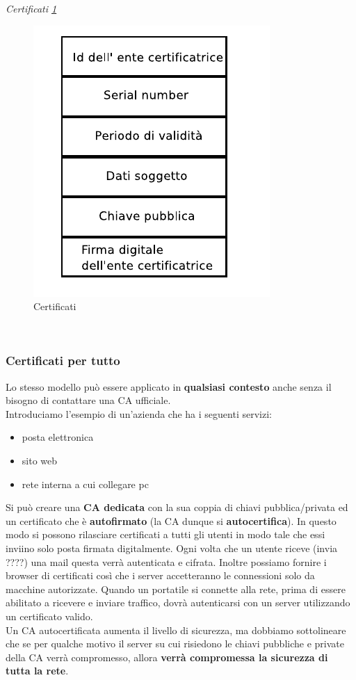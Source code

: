 \documentclass[12pt]{article}
\begin{document}
			\textit{Certificati \ref{fig:17}}\\
			\begin{figure}[h!]
				\centering
				\includegraphics[scale=0.60]{img/certificati.PNG}
				\caption{Certificati \label{fig:17}}
			\end{figure}\\
					
			\subsubsection{Certificati per tutto}
				Lo stesso modello può essere applicato in \textbf{qualsiasi contesto} anche senza il bisogno di contattare una CA ufficiale.\\
				Introduciamo l'esempio di un'azienda che ha i seguenti servizi:
				\begin{itemize}
					\item posta elettronica
					\item sito web
					\item rete interna a cui collegare pc
				\end{itemize}
				Si può creare una \textbf{CA dedicata} con la sua coppia di 
				chiavi pubblica/privata ed un certificato che è \textbf{autofirmato} (la CA dunque si \textbf{autocertifica}). In questo modo si possono rilasciare certificati a tutti gli utenti in modo tale che essi inviino solo posta firmata digitalmente. Ogni volta che un utente riceve (invia ????) una mail questa verrà autenticata e cifrata. Inoltre possiamo fornire i browser di certificati così che i server accetteranno le connessioni solo da macchine autorizzate. Quando un portatile si connette alla rete, prima di essere abilitato a ricevere e inviare traffico, dovrà autenticarsi con un server utilizzando un certificato valido.\\
				Un CA autocertificata aumenta il livello di sicurezza, ma dobbiamo sottolineare che se per qualche motivo il server su cui risiedono le chiavi pubbliche e private della CA verrà compromesso, allora \textbf{verrà compromessa la sicurezza di tutta la rete}.
\end{document}
